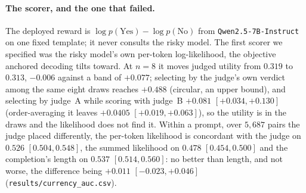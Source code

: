 \paragraph{The scorer, and the one that failed.}\label{app:currency}
The deployed reward is $\log p(\text{Yes}) - \log p(\text{No})$ from \texttt{Qwen2.5-7B-Instruct} on one
fixed template; it never consults the risky model. The first scorer we specified was the risky model's own
per-token log-likelihood, the objective anchored decoding tilts toward. At $n=8$ it moves judged utility
from $0.319$ to $0.313$, $-0.006$ against a band of $+0.077$; selecting by the judge's own verdict among the
same eight draws reaches $+0.488$ (circular, an upper bound), and selecting by judge~A while scoring with
judge~B $+0.081$ $[+0.034, +0.130]$ (order-averaging it leaves $+0.0405$
$[+0.019, +0.063]$), so the utility is in the draws and the likelihood does not find it.
Within a prompt, over $5{,}687$ pairs the judge placed differently, the per-token likelihood is concordant
with the judge on $0.526$ $[0.504, 0.548]$, the summed likelihood on $0.478$ $[0.454, 0.500]$ and the
completion's length on $0.537$ $[0.514, 0.560]$: no better than length, and not worse, the difference being
$+0.011$ $[-0.023, +0.046]$ (\texttt{results/\allowbreak currency\_\allowbreak auc.csv}).


